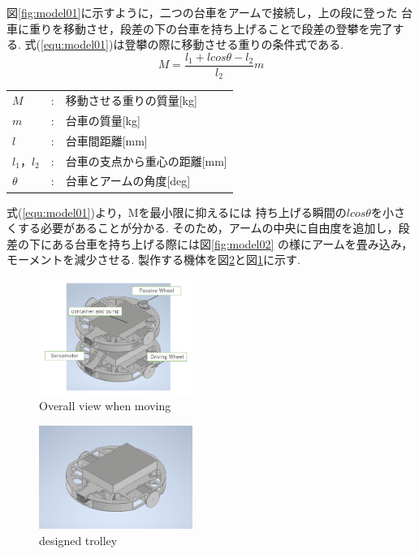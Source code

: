 \documentclass[dvipdfmx]{jsarticle}
\begin{document}
図\ref{fig:model01}に示すように，二つの台車をアームで接続し，上の段に登った
台車に重りを移動させ，段差の下の台車を持ち上げることで段差の登攀を完了する.
式(\ref*{equ:model01})は登攀の際に移動させる重りの条件式である.
\begin{equation}
  M=\frac{l_1+lcos\theta-l_2}{l_2}m
\label{equ:model01}
\end{equation}
\begin{table}[H]
    \begin{tabular}{lcl}
      $M$ & : & 移動させる重りの質量[kg]\\
      $m$ & : & 台車の質量[kg]\\
      $l$ & : & 台車間距離[mm]\\
      $l_1$，$l_2$ & : & 台車の支点から重心の距離[mm]\\
      $\theta$ & : & 台車とアームの角度[deg]\\
  \end{tabular}
\end{table}
式(\ref*{equ:model01})より，Mを最小限に抑えるには
持ち上げる瞬間の$lcos\theta$を小さくする必要があることが分かる.
そのため，アームの中央に自由度を追加し，段差の下にある台車を持ち上げる際には図\ref{fig:model02}
の様にアームを畳み込み，モーメントを減少させる.
製作する機体を図\ref*{fig:CAD}と図\ref*{fig:move}に示す.
\begin{figure}[H]
  \centering
  \includegraphics[width=50mm]{image/kasane.png}
  \caption{Overall view when moving}
  \label{fig:move}
  \end{figure}

\begin{figure}[H]
\centering
\includegraphics[width=50mm]{image/1unit.png}
\caption{designed trolley}
\label{fig:CAD}
\end{figure}
\end{document}
